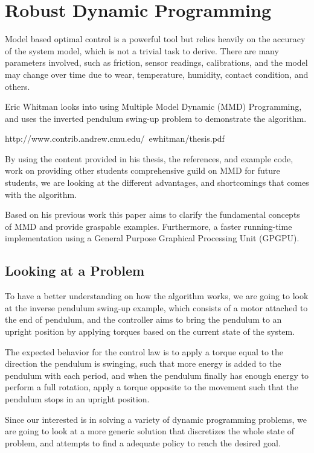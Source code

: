 \documentclass{article}
\begin{document}
\section{Robust Dynamic Programming}
Model based optimal control is a powerful tool but relies heavily on the accuracy of the system model, which is not a trivial task to derive. There are many parameters involved, such as friction, sensor readings, calibrations, and the model may change over time due to wear, temperature, humidity, contact condition, and others.

Eric Whitman looks into using Multiple Model Dynamic (MMD) Programming, and uses the inverted pendulum swing-up problem to demonstrate the algorithm.

 http://www.contrib.andrew.cmu.edu/~ewhitman/thesis.pdf

 
  By using the content provided in his thesis, the references, and example code, work on providing other students comprehensive guild on MMD for future students, we are looking at the different advantages, and shortcomings that comes with the algorithm.

Based on his previous work this paper aims to clarify the fundamental concepts of MMD and provide graspable examples. Furthermore, a faster running-time implementation using a General Purpose Graphical Processing Unit (GPGPU).

\subsection{Looking at a Problem}
	To have a better understanding on how the algorithm works, we are going to look at the  inverse pendulum swing-up example, which consists of a motor attached to the end of pendulum, and the controller aims to bring the pendulum to an upright position by applying torques based on the current state of the system. 

The expected behavior for the control law is to apply a torque equal to the direction the pendulum is swinging, such that more energy is added to the pendulum with each period, and when the pendulum finally has enough energy to perform a full rotation, apply a torque opposite to the movement such that the pendulum stops in an upright position.  

Since our interested is in solving a variety of dynamic programming problems, we are going to look at a more generic solution that discretizes the whole state of problem, and attempts to find a adequate policy to reach the desired goal.  
\end{document}
